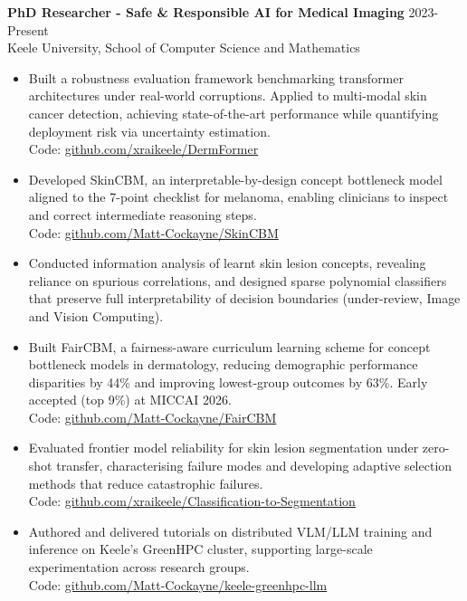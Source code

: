 \documentclass[10pt,a4paper]{article}
\begin{document}
\textbf{PhD Researcher - Safe \& Responsible AI for Medical Imaging} \hfill 2023-Present\\
Keele University, School of Computer Science and Mathematics
\begin{itemize}
\item Built a robustness evaluation framework benchmarking transformer architectures under real-world corruptions. Applied to multi-modal skin cancer detection, achieving state-of-the-art performance while quantifying deployment risk via uncertainty estimation.\\Code: \href{https://github.com/xraikeele/DermFormer}{github.com/xraikeele/DermFormer}
\item Developed SkinCBM, an interpretable-by-design concept bottleneck model aligned to the 7-point checklist for melanoma, enabling clinicians to inspect and correct intermediate reasoning steps.\\Code: \href{https://github.com/Matt-Cockayne/SkinCBM}{github.com/Matt-Cockayne/SkinCBM}
\item Conducted information analysis of learnt skin lesion concepts, revealing reliance on spurious correlations, and designed sparse polynomial classifiers that preserve full interpretability of decision boundaries (under-review, Image and Vision Computing).
\item Built FairCBM, a fairness-aware curriculum learning scheme for concept bottleneck models in dermatology, reducing demographic performance disparities by 44\% and improving lowest-group outcomes by 63\%. Early accepted (top 9\%) at MICCAI 2026.\\Code: \href{https://github.com/Matt-Cockayne/FairCBM}{github.com/Matt-Cockayne/FairCBM}
\item Evaluated frontier model reliability for skin lesion segmentation under zero-shot transfer, characterising failure modes and developing adaptive selection methods that reduce catastrophic failures.\\Code: \href{https://github.com/xraikeele/Classification-to-Segmentation}{github.com/xraikeele/Classification-to-Segmentation}
\item Authored and delivered tutorials on distributed VLM/LLM training and inference on Keele's GreenHPC cluster, supporting large-scale experimentation across research groups.\\Code: \href{https://github.com/Matt-Cockayne/keele-greenhpc-llm}{github.com/Matt-Cockayne/keele-greenhpc-llm}
\end{itemize}
\end{document}
